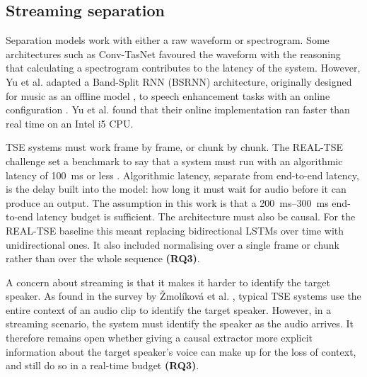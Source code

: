 \subsection{Streaming separation}
\label{sec:streaming}
Separation models work with either a raw waveform or spectrogram. Some architectures such as Conv-TasNet \cite{luo2019convtasnet} favoured the waveform with the reasoning that calculating a spectrogram contributes to the latency of the system. However, Yu et al. adapted a Band-Split RNN (BSRNN) architecture, originally designed for music as an offline model \cite{luo2023music}, to speech enhancement tasks with an online configuration \cite{yu2023high}. Yu et al. found that their online implementation ran faster than real time on an Intel i5 CPU.

TSE systems must work frame by frame, or chunk by chunk. The REAL-TSE challenge set a benchmark to say that a system must run with an algorithmic latency of \SI{100}{\milli\second} or less \cite{wang2026realtse}. Algorithmic latency, separate from end-to-end latency, is the delay built into the model: how long it must wait for audio before it can produce an output. The assumption in this work is that a \SIrange{200}{300}{\milli\second} end-to-end latency budget is sufficient. The architecture must also be causal. For the REAL-TSE baseline this meant replacing bidirectional LSTMs over time with unidirectional ones. It also included normalising over a single frame or chunk rather than over the whole sequence \cite{wang2026realtse} \textbf{(RQ3)}.

A concern about streaming is that it makes it harder to identify the target speaker. As found in the survey by \v{Z}mol\'{i}kov\'{a} et al. \cite{zmolikova2023overview}, typical TSE systems use the entire context of an audio clip to identify the target speaker. However, in a streaming scenario, the system must identify the speaker as the audio arrives. It therefore remains open whether giving a causal extractor more explicit information about the target speaker's voice can make up for the loss of context, and still do so in a real-time budget \textbf{(RQ3)}.

